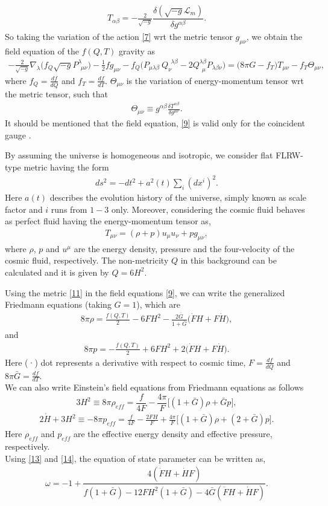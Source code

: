 \documentclass[showpacs,aps,amssymb,preprintnumbers,prd,amsmath,floatfix]{revtex4}
\def \m{\mu}
\def \n{\nu}
\def \a{\alpha}
\def \b{\beta}
\def \d{\delta}
\def \l{\lambda}
\def \s{\sqrt}
\def \ben{\begin{eqnarray}}
\def \een{\end{eqnarray}}
\def \o{\omega}
\def \nb{\nabla}
\def \L{\mathcal{L}_m}
\def \r{\rho}
\def \T{\Theta}
\begin{document}
\ben
T_{\a\b}=-\frac{2}{\s{-g}}\dfrac{\d({\s{-g}\L})}{\d g^{\a\b}}.\label{8}
\een
So taking the variation of the action \eqref{7} wrt the metric tensor $g_{\m\n}$, we obtain the field equation of the $f(Q,T)$ gravity as
\ben
-\frac{2}{\s{-g}}\nb_\l\Big(f_Q\s{-g}P^\l_{~~\m\n}\Big)-\frac{1}{2}f g_{\m\n}-f_Q\Big(P_{\m\l\b}~Q^{~~\l\b}_\n
-2 Q^{\l\b}_{~~\m}P_{\l\b\n}\Big)=\big(8\pi G-f_T\big)T_{\m\n}-f_T\T_{\m\n},\label{9}
\een
where $f_Q=\frac{df}{dQ}$ and $f_T=\frac{df}{dT}$. $\T_{\m\n}$ is the variation of energy-momentum tensor wrt the metric tensor, such that
\ben
\T_{\m\n}\equiv g^{\a\b}\frac{\d T^{\a\b}}{\d g^{\m\n}}.\label{10}
\een
It should be mentioned that the field equation, \eqref{9} is valid only for the coincident gauge \cite{Lavinia}.

By assuming the universe is homogeneous and isotropic, we consider flat FLRW-type metric having the form
\ben
ds^2=-dt^2+a^2(t)\sum_i(dx^{i})^2.\label{11}
\een
Here $a(t)$ describes the evolution history of the universe, simply known as scale factor and $i$ runs from $1-3$ only. Moreover, considering the cosmic fluid behaves as perfect fluid having the energy-momentum tensor as,
\ben
T_{\m\n}=(\r+p)u_\m u_\n +pg_{\m\n},\label{12}
\een
where $\r$, $p$ and $u^\m$ are the energy density, pressure and the four-velocity of the cosmic fluid, respectively. The non-metricity $Q$ in this background can be calculated and it is given by $Q=6H^2$.

Using the metric \eqref{11} in the field equations \eqref{9}, we can write the generalized Friedmann equations (taking $G=1$), which are
\ben
8\pi \r=\frac{f(Q,T)}{2}-6FH^2-\frac{2\bar{G}}{1+\bar{G}}\big(\dot{F}H+F\dot{H}\big),\label{13}
\een
and
\ben
8\pi p=-\frac{f(Q,T)}{2}+6FH^2+2\big(\dot{F}H+F\dot{H}\big)\label{14}.
\een
Here (·) dot represents a derivative with respect to cosmic time, $F=\frac{df}{dQ}$ and $8\pi\bar{G}=\frac{df}{dT}$.
\\
We can also write Einstein’s field equations from Friedmann equations as follows
\begin{equation}
3H^2\equiv 8\pi \r_{eff}=\frac{f}{4F}-\frac{4\pi}{F}\big[(1+\bar{G})\r+\bar{G}p\big],\label{15}
\end{equation}
\ben
2\dot{H}+3H^2\equiv -8\pi p_{eff}=\frac{f}{4F}-\frac{2\dot{F}H}{F}
+\frac{4\pi}{F}\big[(1+\bar{G})\r+(2+\bar{G})p\big]\label{16}.
\een
Here $\r_{eff}$ and $p_{eff}$ are the effective energy density and effective pressure, respectively.
\\
Using \eqref{13} and \eqref{14}, the equation of state parameter can be written as,
\ben
\o=-1+\dfrac{4(\dot{F}H+\dot{H}F)}{f(1+\bar{G})-12FH^2(1+\bar{G})-4\bar{G}(\dot{F}H+\dot{H}F)}.\label{17}
\een
\end{document}
